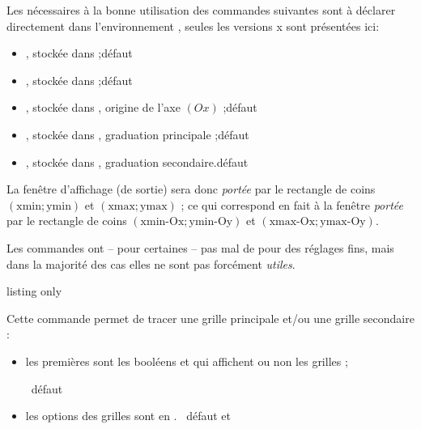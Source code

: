 \begin{noteblock}
Les  nécessaires à la bonne utilisation des commandes suivantes sont à déclarer directement dans l'environnement , seules les versions \og x \fg{}  sont présentées ici:

\begin{itemize}
	\item {}, stockée dans  ;\hfill{}défaut 
	\item {}, stockée dans  ;\hfill{}défaut 
	\item {}, stockée dans , origine de l'axe $(Ox)$ ;\hfill{}défaut 
	\item {}, stockée dans , graduation principale ;\hfill{}défaut 
	\item {}, stockée dans , graduation secondaire.\hfill{}défaut 
\end{itemize}

La fenêtre d'affichage (de sortie) sera donc \textit{portée} par le rectangle de coins $(\text{xmin};\text{ymin})$ et $(\text{xmax};\text{ymax})$ ; ce qui correspond en fait à la fenêtre \TikZ{} \textit{portée} par le rectangle de coins $(\text{xmin-Ox};\text{ymin-Oy})$ et $(\text{xmax-Ox};\text{ymax-Oy})$.

\smallskip

Les commandes ont -- pour certaines -- pas mal de  pour des réglages fins, mais dans la majorité des cas elles ne sont pas forcément \textit{utiles}.
\end{noteblock}

\begin{PresCodeTexPL}{listing only}
\end{PresCodeTexPL}

\begin{cautionblock}
Cette commande permet de tracer une grille principale et/ou une grille secondaire :

\begin{itemize}
	\item les premières  sont les booléens  et  qui affichent ou non les grilles ;

	\hfill~défaut 
	\item les options des grilles sont en \TikZ. \hfill~défaut  et 
\end{itemize}
\vspace*{-\baselineskip}\leavevmode
\end{cautionblock}

